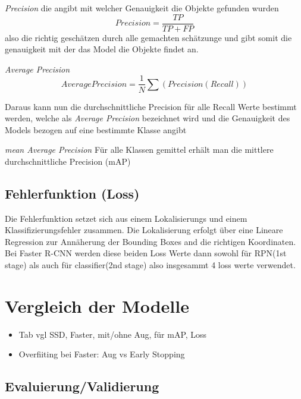 \textit{Precision}
die angibt mit welcher Genauigkeit die Objekte gefunden wurden
\begin{equation}
  Precision = \frac{TP}{TP + FP}
\end{equation}
also die richtig 
geschätzen durch alle gemachten schätzunge und gibt somit die 
genauigkeit mit der das Model die Objekte findet an.


\textit{Average Precision}
\begin{equation}
  Average Precision = \frac{1}{N}\sum(Precision(Recall))
\end{equation}

Daraus kann nun die durchschnittliche Precision für alle Recall 
Werte bestimmt werden, welche als \textit{Average Precision}
bezeichnet wird und die Genauigkeit des Models bezogen auf 
eine bestimmte Klasse angibt

\textit{mean Average Precision}
Für alle Klassen gemittel 
erhält man die mittlere durchschnittliche Precision (mAP)



\subsection*{Fehlerfunktion (Loss)}
Die Fehlerfunktion setzet sich aus einem Lokalisierungs und einem 
Klassifizierungsfehler zusammen. 
Die Lokalisierung erfolgt über eine Lineare Regression zur 
Annäherung der Bounding Boxes and die richtigen Koordinaten.\\

Bei Faster R-CNN werden diese beiden Loss Werte dann sowohl für 
RPN(1st stage) als auch für classifier(2nd stage) also 
insgesammt 4 loss werte verwendet.



\section{Vergleich der Modelle}\label{sec:model_vergleich}
\begin{itemize}
  \item Tab vgl SSD, Faster, mit/ohne Aug, für mAP, Loss
  \item Overfiiting bei Faster: Aug vs Early Stopping
\end{itemize}

\subsection{Evaluierung/Validierung}

